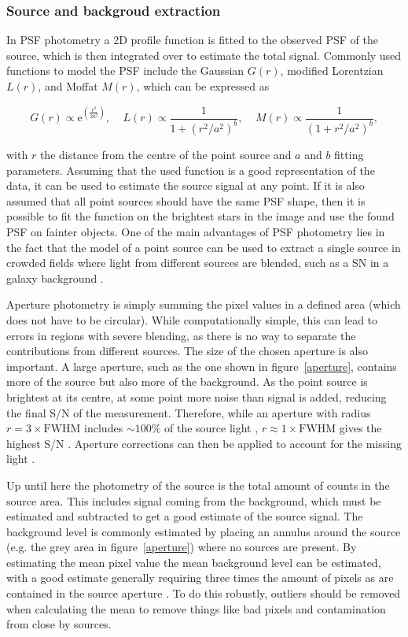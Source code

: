 \documentclass[a4paper,oneside,12pt, class=Latex/Classes/PhDthesisPSnPDF, crop=false]{standalone}
\begin{document}
\subsubsection*{Source and backgroud extraction}
In PSF photometry a 2D profile function is fitted to the observed PSF of the source, which is then integrated over to estimate the total signal. Commonly used functions to model the PSF include the Gaussian $G(r)$, modified Lorentzian $L(r)$, and Moffat $M(r)$, which can be expressed as

\begin{equation}
    G(r) \propto \text{e}^{\left(\frac{r^2}{2a^2}\right)}, \ \ \ \ \ L(r) \propto \frac{1}{1+(r^2/a^2)^b}, \ \ \ \ \ M(r) \propto \frac{1}{(1+r^2/a^2)^b},
\end{equation}

with $r$ the distance from the centre of the point source and $a$ and $b$ fitting parameters. Assuming that the used function is a good representation of the data, it can be used to estimate the source signal at any point. If it is also assumed that all point sources should have the same PSF shape, then it is possible to fit the function on the brightest stars in the image and use the found PSF on fainter objects. One of the main advantages of PSF photometry lies in the fact that the model of a point source can be used to extract a single source in crowded fields where light from different sources are blended, such as a SN in a galaxy background \citep{phot_crowded_fields}.

Aperture photometry is simply summing the pixel values in a defined area (which does not have to be circular). While computationally simple, this can lead to errors in regions with severe blending, as there is no way to separate the contributions from different sources. The size of the chosen aperture is also important. A large aperture, such as the one shown in figure~\ref{aperture}, contains more of the source but also more of the background. As the point source is brightest at its centre, at some point more noise than signal is added, reducing the final S/N of the measurement. Therefore, while an aperture with radius $r=3\times\text{FWHM}$ includes $\sim100\%$ of the source light \citep{max_aperture}, $r\approx1\times\text{FWHM}$ gives the highest S/N \citep{optimal_aperture}. Aperture corrections can then be applied to account for the missing light \citep{optimal_aperture, phot_crowded_fields}.

Up until here the photometry of the source is the total amount of counts in the source area. This includes signal coming from the background, which must be estimated and subtracted to get a good estimate of the source signal. The background level is commonly estimated by placing an annulus around the source (e.g. the grey area in figure~\ref{aperture}) where no sources are present. By estimating the mean pixel value the mean background level can be estimated, with a good estimate generally requiring three times the amount of pixels as are contained in the source aperture \citep{max_aperture}. To do this robustly, outliers should be removed when calculating the mean to remove things like bad pixels and contamination from close by sources.
\end{document}
